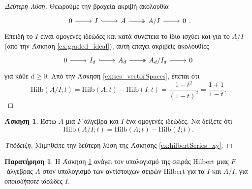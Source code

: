 \documentclass[12pt,a4paper,reqno]{amsart}
\theoremstyle{definition}
\newtheorem{exercise}{Άσκηση}
\newtheorem*{remark}{Παρατήρηση}
\newcommand{\Hilb}{\mathrm{Hilb}}
\begin{document}
\begin{proof}[Δεύτερη Λύση]
  Θεωρούμε την βραχεία ακριβή ακολουθία 
  \[
  \begin{tikzcd}
      0 \arrow[r] & I \arrow[r, hook] & A \arrow[r, two heads] & A/I \arrow[r] & 0
    \end{tikzcd}.
  \]
  Επειδή το $I$ είναι ομογενές ιδεώδες και κατά συνέπεια το ίδιο ισχύει και για το $A/I$ (από την Άσκηση \ref{ex:graded_ideal}), αυτή επάγει ακριβείς ακολουθίες 
  \[
  \begin{tikzcd}
      0 \arrow[r] & I_d \arrow[r, hook] & A_d \arrow[r, two heads] & A_d/I_d\arrow[r] & 0
    \end{tikzcd}
  \]
  για κάθε $d \ge 0$. Από την Άσκηση \ref{ex:ses_vectorSpaces}, έπεται ότι 
  \[
  \Hilb(A/I;t) = \Hilb(A;t) - \Hilb(I;t) = \frac{1-t^2}{(1-t)^2} =  \frac{1+1}{1-t}.
  \]
\end{proof}

\begin{exercise}
  \label{ex:hilbertSeries_of_quotient_rings}
  Έστω $A$ μια $F$-άλγεβρα και $I$ ένα ομογενές ιδεώδες. Να δείξετε ότι 
  \[
  \Hilb(A/I;t) = \Hilb(A;t) - \Hilb(I;t).
  \]
\end{exercise}

\begin{proof}[Υπόδειξη]
  Μιμηθείτε την δεύτερη λύση της Άσκησης \ref{ex:hilbertSeries_xy}.
\end{proof}

\begin{remark}
  Η Άσκηση \ref{ex:hilbertSeries_of_quotient_rings} ανάγει τον υπολογισμό της σειράς Hilbert μιας $F$-άλγεβρας $A$ στον υπολογισμό των αντίστοιχων σειρών Hilbert για τα $I$ και $A/I$, για \emph{οποιοδήποτε} ιδεώδες $I$.
\end{remark}
\end{document}
